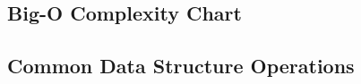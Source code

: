 \subsection{Big-O Complexity Chart}
\begin{summary}
\end{summary}
\newpage

\subsection{Common Data Structure Operations}
\begin{summary}

\end{summary}
